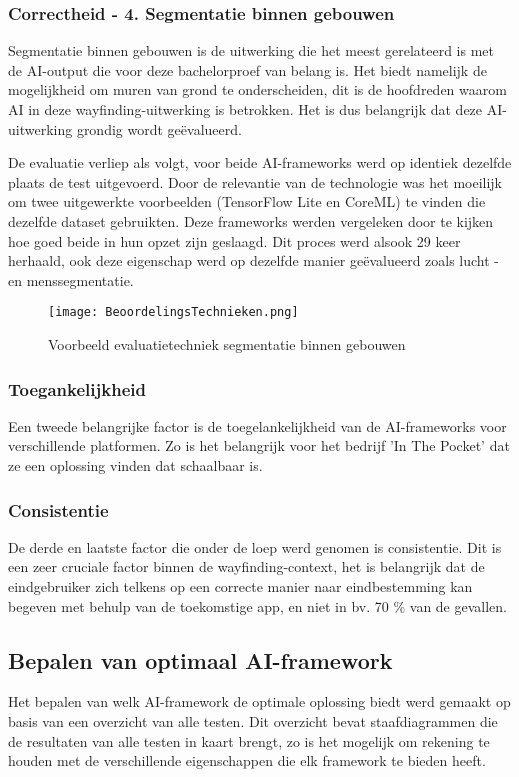 \subsubsection{Correctheid - 4. Segmentatie binnen gebouwen}
Segmentatie binnen gebouwen is de uitwerking die het meest gerelateerd is met de AI-output die voor deze bachelorproef van belang is. Het biedt namelijk de mogelijkheid om muren van grond te onderscheiden, dit is de hoofdreden waarom AI in deze wayfinding-uitwerking is betrokken. Het is dus belangrijk dat deze AI-uitwerking grondig wordt geëvalueerd.

De evaluatie verliep als volgt, voor beide AI-frameworks werd op identiek dezelfde plaats de test uitgevoerd. Door de relevantie van de technologie was het moeilijk om twee uitgewerkte voorbeelden (TensorFlow Lite en CoreML) te vinden die dezelfde dataset gebruikten. Deze frameworks werden vergeleken door te kijken hoe goed beide in hun opzet zijn geslaagd. Dit proces werd alsook 29 keer herhaald, ook deze eigenschap werd op dezelfde manier geëvalueerd zoals lucht -en menssegmentatie.
\begin{figure}[H]
	\centering
	\texttt{[image: BeoordelingsTechnieken.png]}
	\caption{Voorbeeld evaluatietechniek segmentatie binnen gebouwen}
\end{figure}

\subsubsection{Toegankelijkheid}
Een tweede belangrijke factor is de toegelankelijkheid van de AI-frameworks voor verschillende platformen. Zo is het belangrijk voor het bedrijf 'In The Pocket' dat ze een oplossing vinden dat schaalbaar is.

\subsubsection{Consistentie}
De derde en laatste factor die onder de loep werd genomen is consistentie. Dit is een zeer cruciale factor binnen de wayfinding-context, het is belangrijk dat de eindgebruiker zich telkens op een correcte manier naar eindbestemming kan begeven met behulp van de toekomstige app, en niet in bv. 70 \% van de gevallen.

\subsection{Bepalen van optimaal AI-framework}
Het bepalen van welk AI-framework de optimale oplossing biedt werd gemaakt op basis van een overzicht van alle testen. Dit overzicht bevat staafdiagrammen die de resultaten van alle testen in kaart brengt, zo is het mogelijk om rekening te houden met de verschillende eigenschappen die elk framework te bieden heeft.

